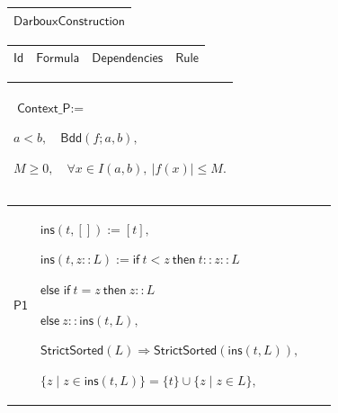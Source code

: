 \documentclass[11pt]{amsart}
\renewcommand{\arraystretch}{1.4}
\newlength{\FTCOneColumnBody}
\newlength{\FTCFourColumnBody}
\begin{document}
{\centering
\renewcommand{\arraystretch}{1.4}
\par\setlength{\parskip}{0pt}\nointerlineskip
\noindent
\begin{tabular}{|@{}>{\centering\arraybackslash}m{\FTCOneColumnBody}|}\hline
$\displaystyle \textsf{DarbouxConstruction}$\\ \hline
\end{tabular}%
\par\setlength{\parskip}{0pt}\nointerlineskip
\noindent
\begin{tabular}{|@{}>{\centering\arraybackslash}m{0.078431\FTCFourColumnBody}|>{\centering\arraybackslash}m{0.535947\FTCFourColumnBody}|>{\centering\arraybackslash}m{0.281045\FTCFourColumnBody}|>{\centering\arraybackslash}m{0.104575\FTCFourColumnBody}|}\hline
$\displaystyle \textsf{Id}$ & $\displaystyle \textsf{Formula}$ & $\displaystyle \textsf{Dependencies}$ & $\displaystyle \textsf{Rule}$\\ \hline
\end{tabular}%
\par\setlength{\parskip}{0pt}\nointerlineskip
\noindent
\begin{tabular}{|@{}>{\centering\arraybackslash}m{\FTCOneColumnBody}|}\hline
$\displaystyle \textsf{Context\_P}:=$\par
$\displaystyle a<b,\quad\textsf{Bdd}(f;a,b),$\par
$\displaystyle M\ge0,\quad\forall x\in I(a,b),\ |f(x)|\le M.$\\ \hline
\end{tabular}%
\par\setlength{\parskip}{0pt}\nointerlineskip
\noindent
\begin{tabular}{|@{}>{\centering\arraybackslash}m{0.078431\FTCFourColumnBody}|>{\centering\arraybackslash}m{0.535947\FTCFourColumnBody}|>{\centering\arraybackslash}m{0.281045\FTCFourColumnBody}|>{\centering\arraybackslash}m{0.104575\FTCFourColumnBody}|}\hline
\hypertarget{proof:P1}{$\displaystyle \textsf{P1}$} & $\displaystyle \textsf{ins}(t,[]):=[t],$\par
$\displaystyle \textsf{ins}(t,z::L):=\textsf{if}\ t<z\ \textsf{then}\ t::z::L$\par
$\displaystyle \textsf{else\ if}\ t=z\ \textsf{then}\ z::L$\par
$\displaystyle \textsf{else}\ z::\textsf{ins}(t,L),$\par
$\displaystyle \textsf{StrictSorted}(L)\Rightarrow\textsf{StrictSorted}(\textsf{ins}(t,L)),$\par
$\displaystyle \{z\mid z\in\textsf{ins}(t,L)\}=\{t\}\cup\{z\mid z\in L\},$\par

\end{tabular}}
\end{document}
